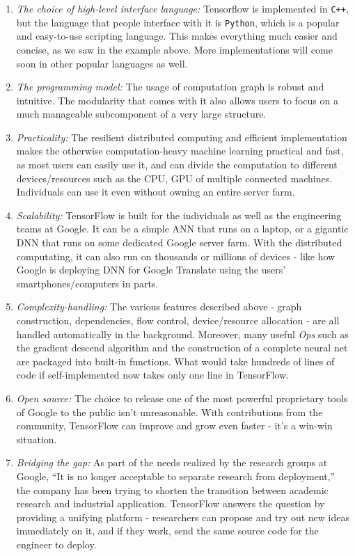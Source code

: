 \documentclass[12pt]{article}  %
\begin{document}
\begin{enumerate}
	\item \emph{The choice of high-level interface language:} Tensorflow is implemented in {\tt C++}, but the language that people interface with it is {\tt Python}, which is a popular and easy-to-use scripting language. This makes everything much easier and concise, as we saw in the example above. More implementations will come soon in other popular languages as well.
	\item \emph{The programming model:} The usage of computation graph is robust and intuitive. The modularity that comes with it also allows users to focus on a much manageable subcomponent of a very large structure.
	\item \emph{Practicality:} The resilient distributed computing and efficient implementation makes the otherwise computation-heavy machine learning practical and fast, as most users can easily use it, and can divide the computation to different devices/resources such as the CPU, GPU of multiple connected machines. Individuals can use it even without owning an entire server farm.
	\item \emph{Scalability:} TensorFlow is built for the individuals as well as the engineering teams at Google. It can be a simple ANN that runs on a laptop, or a gigantic DNN that runs on some dedicated Google server farm. With the distributed computating, it can also run on thousands or millions of devices - like how Google is deploying DNN for Google Translate using the users' smartphones/computers in parts.
	\item \emph{Complexity-handling:} The various features described above - graph construction, dependencies, flow control, device/resource allocation - are all handled automatically in the background. Moreover, many useful \emph{Ops} such as the gradient descend algorithm and the construction of a complete neural net are packaged into built-in functions. What would take hundreds of lines of code if self-implemented now takes only one line in TensorFlow.
	\item \emph{Open source:} The choice to release one of the most powerful proprietary tools of Google to the public isn't unreasonable. With contributions from the community, TensorFlow can improve and grow even faster - it's a win-win situation.
	\item \emph{Bridging the gap:} As part of the needs realized by the research groups at Google, ``It is no longer acceptable to separate research from deployment,'' the company has been trying to shorten the transition between academic research and industrial application. TensorFlow answers the question by providing a unifying platform - researchers can propose and try out new ideas immediately on it, and if they work, send the same source code for the engineer to deploy.
\end{enumerate}
\end{document}
